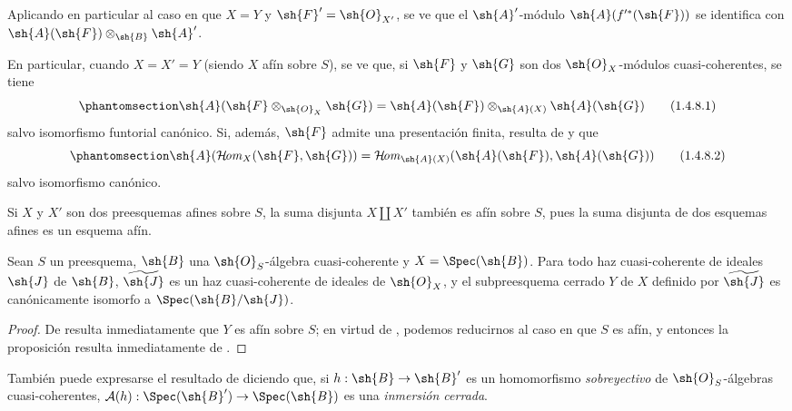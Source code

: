 \documentclass[oneside,10pt]{amsart}
\makeatletter
\newcommand{\ega@arrow}[2]{\mathchoice{#1}{#2}{#2}{#2}}
\renewcommand{\to}{\ega@arrow{\longrightarrow}{\rightarrow}}
\def\shHom{\mathcal{H}\!\mathit{om}}
\let\EGAOriginalLabel\label
\renewcommand{\label}[1]{\phantomsection\EGAOriginalLabel{#1}}
\makeatother
\begin{document}
Aplicando en particular  al caso en que $X=Y$ y $\sh{F}'=\sh{O}_{X'}$, se ve que el $\sh{A}'$-módulo $\sh{A}(f^{\prime*}(\sh{F}))$ se identifica con $\sh{A}(\sh{F})\otimes_\sh{B}\sh{A}'$.

\begin{env}[1.4.8]
\label{II.1.4.8}
En particular, cuando $X=X'=Y$ (siendo $X$ afín sobre $S$), se ve que, si $\sh{F}$ y $\sh{G}$ son dos $\sh{O}_X$-módulos cuasi-coherentes, se tiene
\[
\label{II.1.4.8.1}
  \sh{A}(\sh{F}\otimes_{\sh{O}_X}\sh{G})
  =\sh{A}(\sh{F})\otimes_{\sh{A}(X)}\sh{A}(\sh{G})
  \tag{1.4.8.1}
\]
salvo isomorfismo funtorial canónico.
Si, además, $\sh{F}$ admite una presentación finita, resulta de  y  que
\[
\label{II.1.4.8.2}
  \sh{A}(\shHom_X(\sh{F},\sh{G}))
  =\shHom_{\sh{A}(X)}(\sh{A}(\sh{F}),\sh{A}(\sh{G}))
  \tag{1.4.8.2}
\]
salvo isomorfismo canónico.
\end{env}

\begin{remark}[1.4.9]
\label{II.1.4.9}
Si $X$ y $X'$ son dos preesquemas afines sobre $S$, la suma disjunta $X\amalg X'$ también es afín sobre $S$, pues la suma disjunta de dos esquemas afines es un esquema afín.
\end{remark}

\begin{proposition}[1.4.10]
\label{II.1.4.10}
Sean $S$ un preesquema, $\sh{B}$ una $\sh{O}_S$-álgebra cuasi-coherente y $X=\Spec(\sh{B})$.
Para todo haz cuasi-coherente de ideales $\sh{J}$ de $\sh{B}$, $\widetilde{\sh{J}}$ es un haz cuasi-coherente de ideales de $\sh{O}_X$, y el subpreesquema cerrado $Y$ de $X$ definido por $\widetilde{\sh{J}}$ es canónicamente isomorfo a $\Spec(\sh{B}/\sh{J})$.
\end{proposition}

\begin{proof}
De  resulta inmediatamente que $Y$ es afín sobre $S$; en virtud de , podemos reducirnos al caso en que $S$ es afín, y entonces la proposición resulta inmediatamente de .
\end{proof}

También puede expresarse el resultado de  diciendo que, si $h:\sh{B}\to\sh{B}'$ es un homomorfismo \emph{sobreyectivo} de $\sh{O}_S$-álgebras cuasi-coherentes, $\mathcal A(h):\Spec(\sh{B}')\to\Spec(\sh{B})$ es una \emph{inmersión cerrada}.
\end{document}
